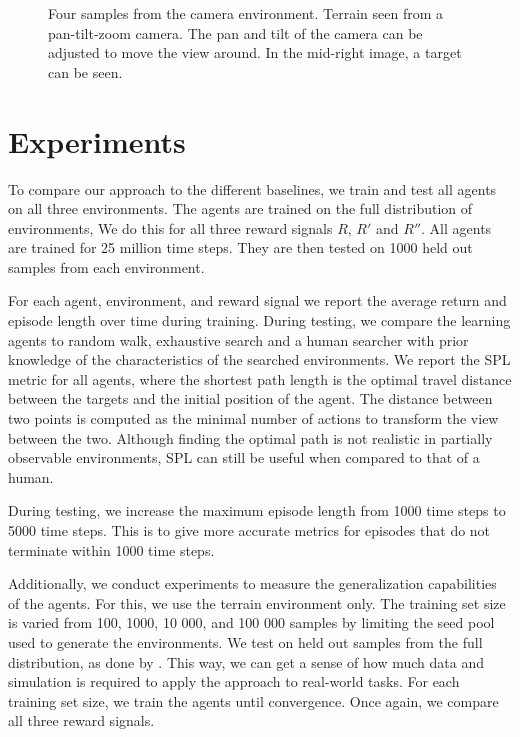 \begin{figure}
    \centering
    
    \label{fig:camera}
    \caption[Camera environment]{Four samples from the camera environment. Terrain seen from a pan-tilt-zoom camera. The pan and tilt of the camera can be adjusted to move the view around. In the mid-right image, a target can be seen.}
\end{figure}

\section{Experiments}
\label{sec:experiments}

To compare our approach to the different baselines,
we train and test all agents on all three environments.
The agents are trained on the full distribution of environments,
We do this for all three reward signals \(R\), \(R'\) and \(R''\).
All agents are trained for 25 million time steps.
They are then tested on 1000 held out samples from each environment.

For each agent, environment, and reward signal we report the average return and episode length over time during training.
During testing, we compare the learning agents to random walk, exhaustive search and a human searcher with prior knowledge of the characteristics of the searched environments.
We report the SPL metric for all agents, where the shortest path length is the optimal travel distance between the targets and the initial position of the agent.
The distance between two points is computed as the minimal number of actions to transform the view between the two.
Although finding the optimal path is not realistic in partially observable environments, SPL can still be useful when compared to that of a human.

During testing, we increase the maximum episode length from 1000 time steps to 5000 time steps.
This is to give more accurate metrics for episodes that do not terminate within 1000 time steps. 

Additionally, we conduct experiments to measure the generalization capabilities of the agents.
For this, we use the terrain environment only.
The training set size is varied from 100, 1000, 10 000, and 100 000 samples by limiting the seed pool used to generate the environments.
We test on held out samples from the full distribution, as done by \cite{cobbe_procgen_2020}.
This way, we can get a sense of how much data and simulation is required to apply the approach to real-world tasks.
For each training set size, we train the agents until convergence.
Once again, we compare all three reward signals.

